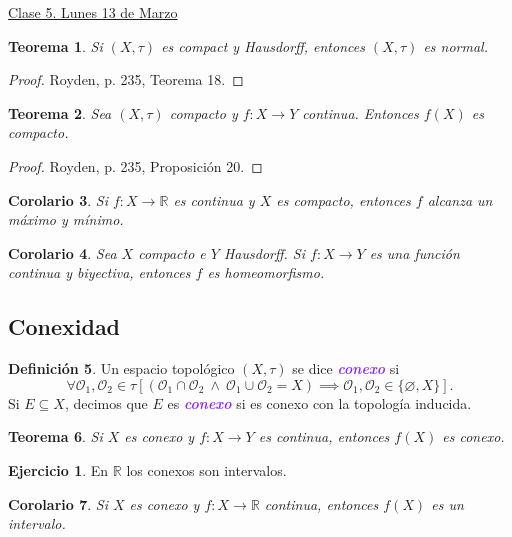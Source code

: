 \documentclass{article}
\newtheorem{theorem}{Teorema}[subsection]
\newtheorem{corollary}[theorem]{Corolario}
\theoremstyle{definition}
\newtheorem{definition}[theorem]{Definición}
\newtheorem{exercise}{Ejercicio}
\theoremstyle{remark}
\numberwithin{equation}{section}
\renewcommand{\O}{\mathcal{O}}
\newcommand{\R}{\mathbb{R}}
\renewcommand{\t}{\tau}
\newcommand{\cor}[1]{\left[ #1 \right]}
\newcommand{\wea}[1]{\textcolor{BlueViolet}{\textbf{\emph{#1}}}}
\newcommand{\fecha}[1]{\begin{flushright} \underline{#1} \end{flushright}}
\begin{document}
\fecha{Clase 5. Lunes 13 de Marzo}

\begin{theorem}
  Si $(X,\t)$ es compact y Hausdorff, entonces $(X,\t)$ es normal.
\end{theorem}
\begin{proof}
  Royden, p. 235, Teorema 18.
\end{proof}

\begin{theorem}
  Sea $(X,\t)$ compacto y $f \colon X \to Y$ continua. Entonces $f(X)$ es compacto.
\end{theorem}
\begin{proof}
  Royden, p. 235, Proposición 20.
\end{proof}

\begin{corollary}
  Si $f \colon X \to \R$ es continua y $X$ es compacto, entonces $f$ alcanza un máximo y mínimo.
\end{corollary}

\begin{corollary}
  Sea $X$ compacto e $Y$ Hausdorff. Si $f \colon X \to Y$ es una función continua y biyectiva, entonces $f$ es homeomorfismo.
\end{corollary}

\newpage
\subsection{Conexidad}

\begin{definition}
  Un espacio topológico $(X,\t)$ se dice \wea{conexo} si
  \[\forall \O_1, \O_2 \in \t \cor{
    (\O_1 \cap \O_2 \ \land\ \O_1 \cup \O_2 = X) \implies \O_1, \O_2 \in \{\varnothing, X\}
  }.\]
  Si $E \subseteq X$, decimos que $E$ es \wea{conexo} si es conexo con la topología inducida.
\end{definition}

\begin{theorem}
  Si $X$ es conexo y $f \colon X \to Y$ es continua, entonces $f(X)$ es conexo.
\end{theorem}

\begin{exercise}
  En $\R$ los conexos son intervalos.
\end{exercise}

\begin{corollary}
  Si $X$ es conexo y $f \colon X \to \R$ continua, entonces $f(X)$ es un intervalo.
\end{corollary}
\end{document}
